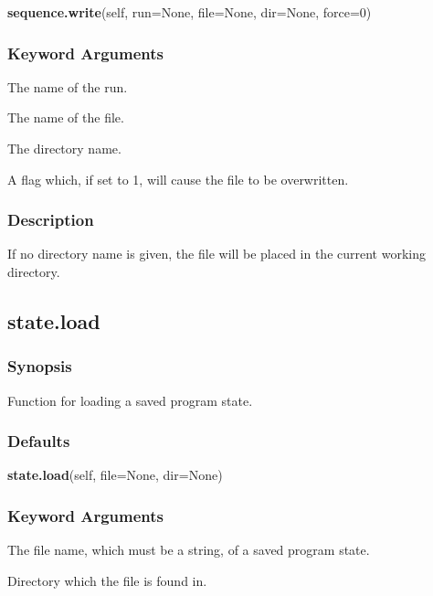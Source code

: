  \textsf{\textbf{sequence.write}(self, run=None, file=None, dir=None, force=0)} 

  
 \subsubsection{Keyword Arguments} 

   The name of the run.   

   The name of the file.   

   The directory name.   

   A flag which, if set to 1, will cause the file to be overwritten.  

  

  
 \subsubsection{Description} 

 If no directory name is given, the file will be placed in the current working directory. 
  

  

 \newpage 

 \subsection{state.load} 

  
 \subsubsection{Synopsis} 

 Function for loading a saved program state. 
  

  
 \subsubsection{Defaults} 

 \textsf{\textbf{state.load}(self, file=None, dir=None)} 

  
 \subsubsection{Keyword Arguments} 

   The file name, which must be a string, of a saved program state.   

   Directory which the file is found in.  

